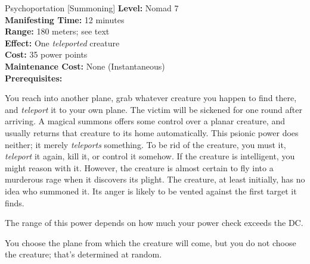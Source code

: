 {Psychoportation [Summoning]}
{
	\textbf{Level:}
	Nomad 7\\
	\textbf{Manifesting Time:}
	12 minutes\\
	\textbf{Range:}
	180 meters; see text\\
	\textbf{Effect:}
	One \emph{teleported} creature\\
	\textbf{Cost:}
	35 power points\\
	\textbf{Maintenance Cost:}
	None (Instantaneous)\\
	\textbf{Prerequisites:}
	\\
}
{
	You reach into another plane, grab whatever creature you happen to find there, and \emph{teleport} it to your own plane. The victim will be sickened for one round after arriving. A magical summons offers some control over a planar creature, and usually returns that creature to its home automatically. This psionic power does neither; it merely \emph{teleports} something. To be rid of the creature, you must  it, \emph{teleport} it again, kill it, or control it somehow. If the creature is intelligent, you might reason with it. However, the creature is almost certain to fly into a murderous rage when it discovers its plight. The creature, at least initially, has no idea who summoned it. Its anger is likely to be vented against the first target it finds.

	The range of this power depends on how much your power check exceeds the DC.


	You choose the plane from which the creature will come, but you do not choose the creature; that's determined at random.
}
